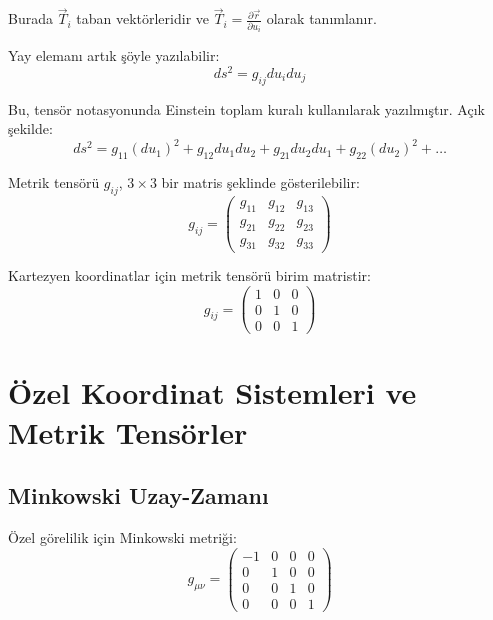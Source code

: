 \documentclass[11pt,letterpaper,twocolumn]{fenbil}
\begin{document}
Burada $\vec{T}_i$ taban vektörleridir ve $\vec{T}_i = \frac{\partial \vec{r}}{\partial u_i}$ olarak tanımlanır.

Yay elemanı artık şöyle yazılabilir:
\begin{equation}
ds^2 = g_{ij} du_i du_j
\end{equation}

Bu, tensör notasyonunda Einstein toplam kuralı kullanılarak yazılmıştır. Açık şekilde:
\begin{equation}
ds^2 = g_{11}(du_1)^2 + g_{12}du_1 du_2 + g_{21}du_2 du_1 + g_{22}(du_2)^2 + \ldots
\end{equation}

Metrik tensörü $g_{ij}$, $3 \times 3$ bir matris şeklinde gösterilebilir:
\begin{equation}
g_{ij} = 
\begin{pmatrix}
g_{11} & g_{12} & g_{13} \\
g_{21} & g_{22} & g_{23} \\
g_{31} & g_{32} & g_{33}
\end{pmatrix}
\end{equation}

Kartezyen koordinatlar için metrik tensörü birim matristir:
\begin{equation}
g_{ij} = 
\begin{pmatrix}
1 & 0 & 0 \\
0 & 1 & 0 \\
0 & 0 & 1
\end{pmatrix}
\end{equation}

\section{Özel Koordinat Sistemleri ve Metrik Tensörler}

\subsection{Minkowski Uzay-Zamanı}

Özel görelilik için Minkowski metriği:
\begin{equation}
g_{\mu\nu} = 
\begin{pmatrix}
-1 & 0 & 0 & 0 \\
0 & 1 & 0 & 0 \\
0 & 0 & 1 & 0 \\
0 & 0 & 0 & 1
\end{pmatrix}
\end{equation}
\end{document}
